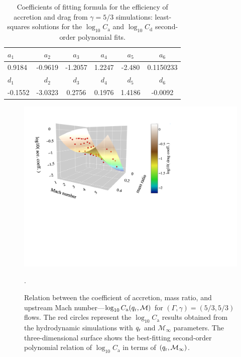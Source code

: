 \begin{table}[h]
\centering\begin{tabular}{lccccc}
\hline\hline
\rule{0pt}{3ex}
$a_1$ & $a_2$ & $a_3$ & $a_4$ & $a_5$ & $a_6$ \\
\hline
\rule{0pt}{3ex}%
\vspace*{0.1cm}
0.9184 & -0.9619 & -1.2057 & 1.2247 & -2.480 & 0.1150233 \\
\hline\hline
\rule{0pt}{3ex}
$d_1$ & $d_2$ & $d_3$ & $d_4$ & $d_5$ & $d_6$ \\
\hline
\rule{0pt}{3ex}%
\vspace*{0.1cm}
-0.1552 & -3.0323 & 0.2756 & 0.1976 & 1.4186 & -0.0092 \\
\hline
\end{tabular}
\caption{Coefficients of fitting formula for the efficiency of accretion and drag from $\gamma = 5/3$ simulations: least-squares solutions for the $\log_{10} C_{\mathrm a}$ and $\log_{10} C_{\mathrm d}$ second-order polynomial fits.}
\label{tab:sims_53_fits}
\end{table}

\begin{figure}
  \centering
  \includegraphics[width=14cm]{figures/common_envelope/logmdot_order2_g53.pdf}
\caption{Relation between the coefficient of accretion, mass ratio, and upstream Mach number---$\log_{10}C_{\mathrm a} (q_{\rm r}, \mathcal{M})$ for $(\Gamma, \gamma) = (5/3, 5/3)$ flows. The red circles represent the $\log_{10}C_{\mathrm a}$ results obtained from the hydrodynamic simulations with $q_{\rm r}$ and $\mathcal{M}_\infty$ parameters. The three-dimensional surface shows the best-fitting second-order polynomial relation of $\log_{10}C_{\mathrm a}$ in terms of $(q_{\rm r}, \mathcal{M}_\infty)$.\label{fig:logmdot_g53}}.
\end{figure}

